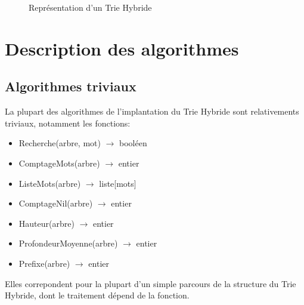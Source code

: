 \documentclass[a4paper,12pt]{report}
\begin{document}
\begin{figure}[!htbp]
\caption{Représentation d'un Trie Hybride}
\end{figure}

\section{Description des algorithmes}
\subsection{Algorithmes triviaux}
La plupart des algorithmes de l'implantation du Trie Hybride sont relativements triviaux, notamment
les fonctions:
\begin{itemize}
 \item Recherche(arbre, mot) $\rightarrow$ booléen
 \item ComptageMots(arbre) $\rightarrow$ entier
 \item ListeMots(arbre) $\rightarrow$ liste[mots]
 \item ComptageNil(arbre) $\rightarrow$ entier
 \item Hauteur(arbre) $\rightarrow$ entier
 \item ProfondeurMoyenne(arbre) $\rightarrow$ entier
 \item Prefixe(arbre) $\rightarrow$ entier
\end{itemize}
Elles correpondent pour la plupart d'un simple parcours de la structure du Trie Hybride, dont le traitement
dépend de la fonction.
\end{document}
